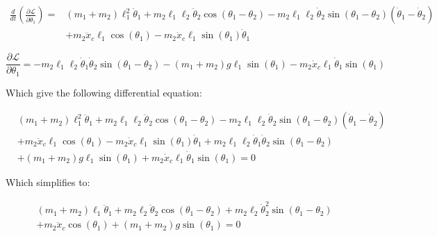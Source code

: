 \documentclass[10pt]{article}
\begin{document}
    \begin{equation} \label{eq: lagrange Step2}
        \begin{aligned}
        \frac{d}{dt} \left(\frac{\partial \mathcal{L}}{\partial \dot\theta_1}\right) =& 
         (m_1 + m_2)\ell_1^2\ddot\theta_1   +   m_2\ell_1\ell_2\ddot\theta_2\cos(\theta_1 - \theta_2)  -m_2\ell_1\ell_2\dot\theta_2\sin(\theta_1-\theta_2)(\dot\theta_1 - \dot\theta_2) \\
           & +   m_2\ddot x_c\ell_1\cos(\theta_1) - m_2 \dot x_c\ell_1\sin(\theta_1)\dot\theta_1
        \end{aligned}
    \end{equation}

    
    \begin{equation} \label{eq: lagrange Step3}
        \frac{\partial \mathcal{L}}{\partial\theta_1} =
        -m_2\ell_1\ell_2\dot\theta_1\dot\theta_2\sin(\theta_1-\theta_2) 
        - (m_1 + m_2)g\ell_1\sin(\theta_1)
        -m_2\dot x_c\ell_1\dot\theta_1\sin(\theta_1)
    \end{equation}

    Which give the following differential equation:

    \begin{equation}
        \begin{aligned}
            &(m_1 + m_2)\ell_1^2\ddot\theta_1   +   m_2\ell_1\ell_2\ddot\theta_2\cos(\theta_1 - \theta_2)  -m_2\ell_1\ell_2\dot\theta_2\sin(\theta_1-\theta_2)(\dot\theta_1 - \dot\theta_2)\\
            &+   m_2\ddot x_c\ell_1\cos(\theta_1) - m_2 \dot x_c\ell_1\sin(\theta_1)\dot\theta_1 + m_2\ell_1\ell_2\dot\theta_1\dot\theta_2\sin(\theta_1-\theta_2) \\ 
            & + (m_1 + m_2)g\ell_1\sin(\theta_1) + m_2\dot x_c\ell_1\dot\theta_1\sin(\theta_1) = 0
        \end{aligned}
    \end{equation}   


    Which simplifies to:

    \begin{equation}
        \begin{aligned}
            &(m_1 + m_2)\ell_1\ddot\theta_1   +   m_2\ell_2\ddot\theta_2\cos(\theta_1 - \theta_2)  +  m_2\ell_2\dot\theta_2^2\sin(\theta_1-\theta_2)\\
            &+   m_2\ddot x_c\cos(\theta_1) + (m_1 + m_2)g\sin(\theta_1) = 0
        \end{aligned}
    \end{equation}  
\end{document}
